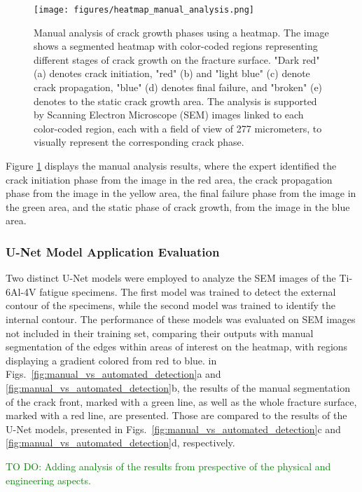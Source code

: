 \documentclass[preprint,12pt]{elsarticle}
\begin{document}
\begin{figure}[t!]
\centering
\texttt{[image: figures/heatmap\_manual\_analysis.png]}
\caption{Manual analysis of crack growth phases using a heatmap. The image shows a segmented heatmap with color-coded regions representing different stages of crack growth on the fracture surface. "Dark red" (a) denotes crack initiation, "red" (b) and "light blue" (c) denote crack propagation, "blue" (d) denotes final failure, and "broken" (e) denotes to the static crack growth area. The analysis is supported by Scanning Electron Microscope (SEM) images linked to each color-coded region, each with a field of view of 277 micrometers, to visually represent the corresponding crack phase.}
\label{fig:heatmap_manual_analysis}
\end{figure}

Figure \ref{fig:heatmap_manual_analysis} displays the manual analysis results,
where the expert identified the crack initiation phase from the image in the red area,
the crack propagation phase from the image in the yellow area,
the final failure phase from the image in the green area, and the static phase of crack growth,
from the image in the blue area.

\subsubsection{U-Net Model Application Evaluation}
Two distinct U-Net models were employed to analyze the SEM images of the Ti-6Al-4V fatigue specimens.
The first model was trained to detect the external contour of the specimens, while the second model was trained to identify the internal contour.
The performance of these models was evaluated on SEM images not included in their training set, comparing their outputs with manual segmentation of the edges within areas of interest on the heatmap, with regions displaying a gradient colored from red to blue.
in Figs.~\ref{fig:manual_vs_automated_detection}a and \ref{fig:manual_vs_automated_detection}b, the results of the manual segmentation of the crack front, marked with a green line, as well as the whole fracture surface, marked with a red line, are presented.
Those are compared to the results of the U-Net models, presented in Figs.~\ref{fig:manual_vs_automated_detection}c and \ref{fig:manual_vs_automated_detection}d, respectively.


\textcolor{green}{TO DO: Adding analysis of the results from prespective of the physical and engineering aspects.}
\end{document}
